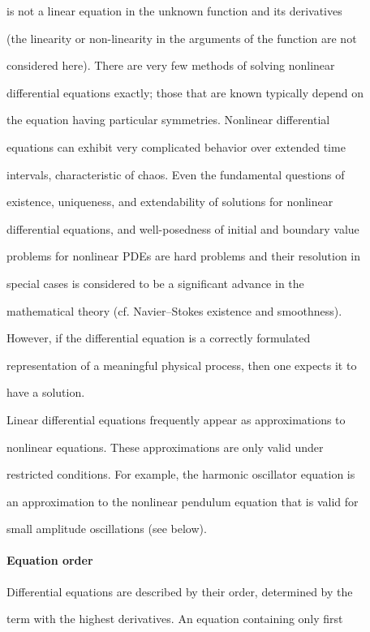 is not a linear equation in the unknown function and its derivatives

(the linearity or non-linearity in the arguments of the function are not

considered here). There are very few methods of solving nonlinear

differential equations exactly; those that are known typically depend on

the equation having particular symmetries. Nonlinear differential

equations can exhibit very complicated behavior over extended time

intervals, characteristic of chaos. Even the fundamental questions of

existence, uniqueness, and extendability of solutions for nonlinear

differential equations, and well-posedness of initial and boundary value

problems for nonlinear PDEs are hard problems and their resolution in

special cases is considered to be a significant advance in the

mathematical theory (cf. Navier--Stokes existence and smoothness).

However, if the differential equation is a correctly formulated

representation of a meaningful physical process, then one expects it to

have a solution.



Linear differential equations frequently appear as approximations to

nonlinear equations. These approximations are only valid under

restricted conditions. For example, the harmonic oscillator equation is

an approximation to the nonlinear pendulum equation that is valid for

small amplitude oscillations (see below).



\paragraph{Equation order}



Differential equations are described by their order, determined by the

term with the highest derivatives. An equation containing only first

